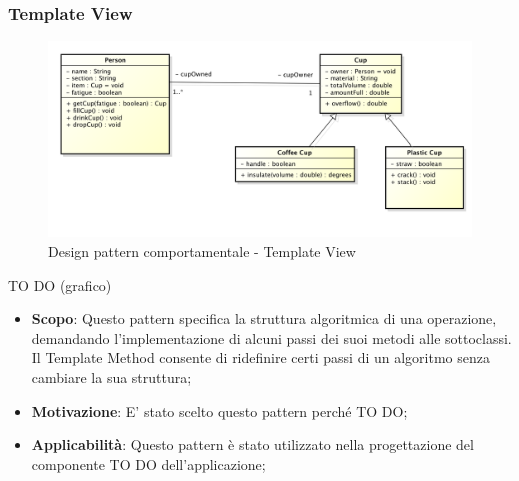 		\subsubsection{Template View} %
		
		
		\begin{figure}[htbp]
			\centering
			\centerline{\includegraphics[scale=0.3]{./images/example_graph.png}}
			\caption{Design pattern comportamentale - Template View}
		\end{figure}
		TO DO (grafico)
		
		
		\begin{itemize}
			\item \textbf{Scopo}: Questo pattern specifica la struttura algoritmica di una operazione, demandando l'implementazione di alcuni passi dei suoi metodi alle sottoclassi. Il Template Method consente di ridefinire certi passi di un algoritmo senza cambiare la sua struttura;
			
			\item \textbf{Motivazione}: E' stato scelto questo pattern perché TO DO;
			
			\item \textbf{Applicabilità}: Questo pattern è stato utilizzato nella progettazione del componente TO DO dell'applicazione;
			
		\end{itemize}



